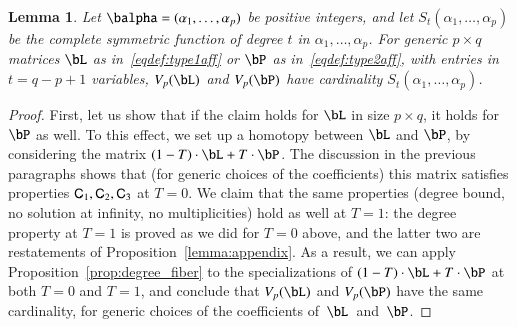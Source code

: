\documentclass[amsthm]{elsart}
\newtheorem{lemma}[definition]{Lemma}
\begin{document}
\begin{lemma}
  Let $\balpha=(\alpha_1,\dots,\alpha_p)$ be positive integers,  and
  let $S_{t}(\alpha_1,\dots,\alpha_p)$ be the complete symmetric
  function of degree $t$ in $\alpha_1,\dots,\alpha_p$. For generic $p
  \times q$ matrices $\bL$ as in~\eqref{eqdef:type1aff} or $\bP$ as
  in~\eqref{eqdef:type2aff}, with entries in $t=q-p+1$ variables,
$V_p(\bL)$ and $V_p(\bP)$ have
  cardinality $S_{t}(\alpha_1,\dots,\alpha_p)$.
\end{lemma}
\begin{proof}
  First, let us show that if the claim holds for $\bL$ in size $p
  \times q$, it holds for $\bP$ as well. To this effect, we set up a
  homotopy between $\bL$ and $\bP$, by considering the matrix
  $(1-T)\cdot\bL + T\cdot\bP$.  The discussion in the previous
  paragraphs shows that (for generic choices of the coefficients) this
  matrix satisfies properties $\mathsf{C}_1,\mathsf{C}_2,\mathsf{C}_3$ at $T=0$.  We claim
  that the same properties (degree bound, no solution at infinity, no
  multiplicities) hold as well at $T=1$: the degree property at $T=1$
  is proved as we did for $T=0$ above, and the latter two are
  restatements of Proposition~\ref{lemma:appendix}. As a result, we
  can apply Proposition~\ref{prop:degree_fiber} to the specializations
  of $(1-T)\cdot\bL + T\cdot\bP$ at both $T=0$ and $T=1$, and conclude
  that $V_p(\bL)$ and $V_p(\bP)$ have the same cardinality, for
  generic choices of the coefficients of~$\bL$~and~$\bP$.


\end{proof}
\end{document}
